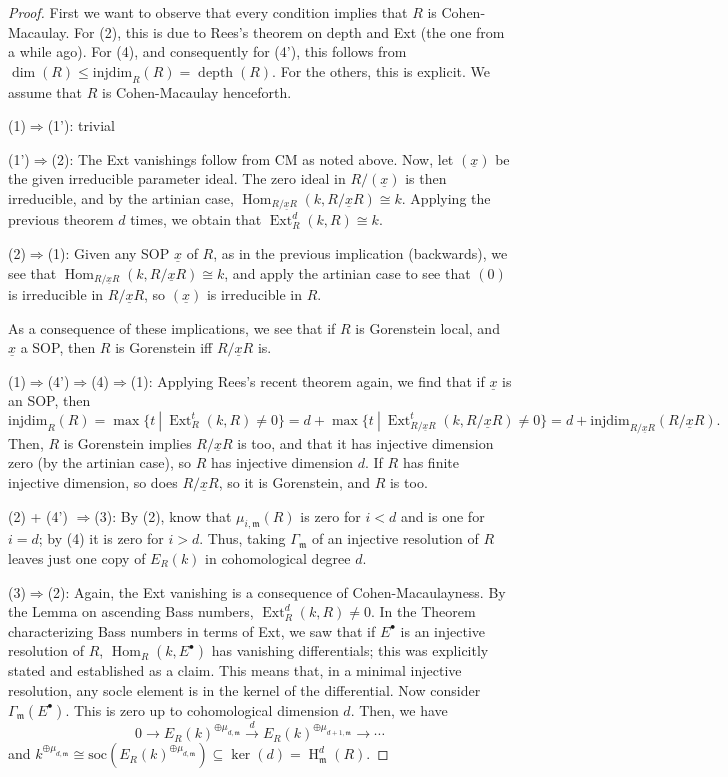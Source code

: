 \documentclass[11pt]{book}
\numberwithin{equation}{section}
\numberwithin{theorem}{chapter}
\theoremstyle{definition}
\newtheorem*{basic properties}{Basic Properties}
\newtheorem*{Important Remark}{Important Remark}
\theoremstyle{remark}
\newcommand{\m}{\mathfrak{m}}
\newcommand{\Hom}{\operatorname{Hom}}
\newcommand{\Ext}{\operatorname{Ext}}
\renewcommand{\ker}{\operatorname{ker}}
\renewcommand{\dim}{\operatorname{dim}}
\newcommand{\depth}{\operatorname{depth}}
\renewcommand{\H}{\operatorname{H}}
\begin{document}
\begin{proof}
	First we want to observe that every condition implies that $R$ is Cohen-Macaulay. For (2), this is due to Rees's theorem on depth and Ext (the one from a while ago). For (4), and consequently for (4'), this follows from $\dim(R)\leq \mathrm{injdim}_R(R) = \depth(R)$. For the others, this is explicit. We assume that $R$ is Cohen-Macaulay henceforth.
	
	(1)$\Rightarrow$(1'): trivial
	
	(1')$\Rightarrow$(2): The Ext vanishings follow from CM as noted above. Now, let $(\underline{x})$ be the given irreducible parameter ideal. The zero ideal in $R/(\underline{x})$ is then irreducible, and by the artinian case, $\Hom_{R/\underline{x}R}(k,R/\underline{x}R)\cong k$. Applying the previous theorem $d$ times, we obtain that $\Ext^d_R(k,R)\cong k$.
	
	(2)$\Rightarrow$(1): Given any SOP $\underline{x}$ of $R$, as in the previous implication (backwards), we see that $\Hom_{R/\underline{x}R}(k,R/\underline{x}R)\cong k$, and apply the artinian case to see that $(0)$ is irreducible in $R/\underline{x}R$, so $(\underline{x})$ is irreducible in $R$.
	
	As a consequence of these implications, we see that if $R$ is Gorenstein local, and $\underline{x}$ a SOP, then $R$ is Gorenstein iff $R/\underline{x}R$ is.
	
	(1)$\Rightarrow$(4')$\Rightarrow$(4)$\Rightarrow$(1): Applying Rees's recent theorem again, we find that if $\underline{x}$ is an SOP, then
	\[ \mathrm{injdim}_R(R) = \max\{ t \ | \ \Ext^t_R(k,R)\neq 0 \} = d+\max\{ t \ | \ \Ext^t_{R/\underline{x}R}(k,R/\underline{x}R)\neq 0 \} = d+\mathrm{injdim}_{R/\underline{x}R}({R/\underline{x}R}). \]
	Then, $R$ is Gorenstein implies $R/\underline{x}R$ is too, and that it has injective dimension zero (by the artinian case), so $R$ has injective dimension $d$. If $R$ has finite injective dimension, so does $R/\underline{x}R$, so it is Gorenstein, and $R$ is too.

	
(2) + (4') $\Rightarrow$(3): By (2), know that $\mu_{i,\m}(R)$ is zero for $i<d$ and is one for $i=d$; by (4) it is zero for $i>d$. Thus, taking $\Gamma_\m$ of an injective resolution of $R$ leaves just one copy of $E_R(k)$ in cohomological degree $d$.
	
(3)$\Rightarrow$(2):  Again, the Ext vanishing is a consequence of Cohen-Macaulayness. By the Lemma on ascending Bass numbers, $\Ext^d_R(k,R)\neq 0$. In the Theorem characterizing Bass numbers in terms of Ext, we saw that if $E^\bullet$ is an injective resolution of $R$, $\Hom_R(k,E^\bullet)$ has vanishing differentials; this was explicitly stated and established as a claim. This means that, in a minimal injective resolution, any socle element is in the kernel of the differential. Now consider $\Gamma_{\m}(E^\bullet)$. This is zero up to cohomological dimension $d$. Then, we have
\[ 0 \to E_R(k)^{\oplus\mu_{d,\m}} \stackrel{d}{\longrightarrow} E_R(k)^{\oplus\mu_{d+1,\m}} \to \cdots\]
and $k^{\oplus \mu_{d,\m}}\cong \mathrm{soc}(E_R(k)^{\oplus\mu_{d,\m}})\subseteq \ker(d) = \H^d_{\m}(R)$.
\end{proof}
\end{document}
